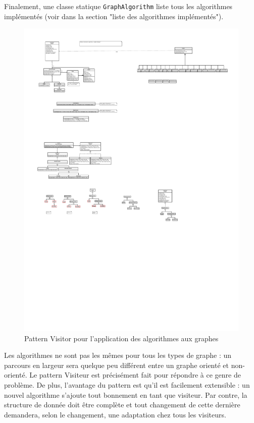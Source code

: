 \documentclass[french]{article}
\begin{document}
			Finalement, une classe statique \lstinline[basicstyle=\ttfamily\color{blue}]|GraphAlgorithm| liste tous les algorithmes implémentés (voir dans la section "liste des algorithmes implémentés").
			
			\begin{figure}[H]
				\centering
				\includegraphics[scale=2.4]{Conception/graph/visitor.pdf}
				\caption{Pattern Visitor pour l'application des algorithmes aux graphes}
			\end{figure}
			
			Les algorithmes ne sont pas les mêmes pour tous les types de graphe : un parcours en largeur sera quelque peu différent entre un graphe orienté et non-orienté. Le pattern Visiteur est précisément fait pour répondre à ce genre de problème. De plus, l'avantage du pattern est qu'il est facilement extensible : un nouvel algorithme s'ajoute tout bonnement en tant que visiteur. Par contre, la structure de donnée doit être complète et tout changement de cette dernière demandera, selon le changement, une adaptation chez tous les visiteurs.\\
			
\end{document}
